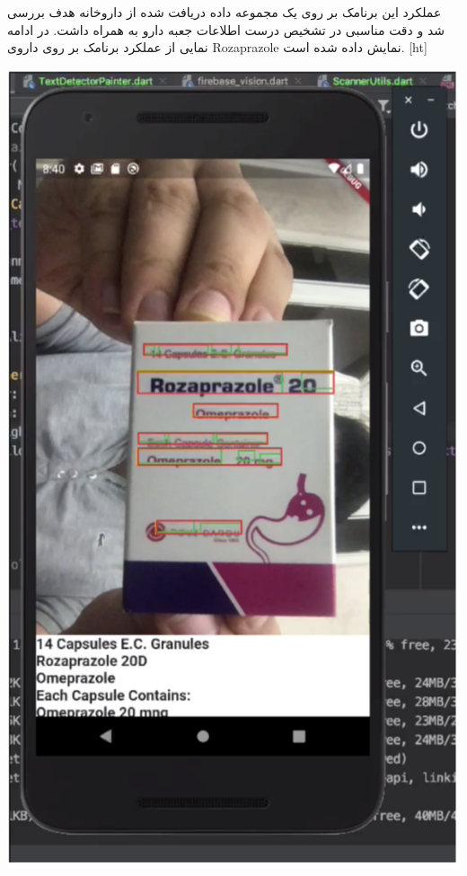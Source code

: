 عملکرد این برنامک بر روی یک مجموعه داده دریافت شده از داروخانه هدف بررسی شد و دقت مناسبی در تشخیص درست اطلاعات جعبه دارو به همراه داشت. در ادامه نمایی از عملکرد برنامک بر روی داروی Rozaprazole نمایش داده شده است.
\newline
{}[ht]
\begin{center}
\includegraphics[scale=0.7]{front/template/images/test.png}
\end{center}

